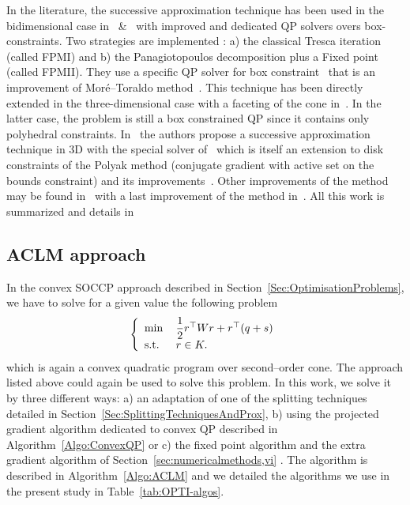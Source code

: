 In the literature, the successive approximation technique has been used in the bidimensional case in~\citep{Haslinger.ea_CMAME2002} \&~\citep{Dostal_JCAM2002} with improved and dedicated QP solvers overs box-constraints. Two strategies are implemented : a) the classical Tresca iteration (called FPMI) and  b) the Panagiotopoulos decomposition plus a Fixed point (called FPMII). They use  a specific QP solver for box constraint~\cite{Dostal_SIOPT1997} that is an improvement of Mor\'e--Toraldo method~\citep{More.Toraldo1991}. This technique has been directly extended in the three-dimensional case with a faceting of the cone in~\cite{Haslinger.ea_JCAM2004}. In the latter case, the problem is still a  box constrained QP since it contains only polyhedral constraints. In~\cite{Haslinger.ea_MCS2012} the authors propose a successive approximation technique in 3D with the special solver of~\cite{Kucera_OMS2007,Kucera_SIOPT2008} which is itself an extension to disk constraints of the Polyak method (conjugate gradient with active set on the bounds constraint) and its improvements~\cite{Dostal_SIOPT1997,Dostal.Schoberl_COA2005}. Other improvements of the method may be found in~\cite{Dostal.Kucera_SIOPT2010} with a last improvement of the method in~\cite{Dostal.Kozubek_MP2012}. All this work is summarized and details in ~\cite{Dostal.ea_AMM2016}


\subsection{ACLM approach}

In the convex SOCCP approach described in Section~\ref{Sec:OptimisationProblems}, we have to solve for a given value the following problem
\begin{equation}\label{eq:ACLM-4}
  \left\{
    \begin{array}{ll}
      \min\,&\Frac 1 2 r^\top W r + r^\top (q + s)  \\
      \text{s.t. } & r \in K.
    \end{array}
  \right.
\end{equation}
which is again a convex quadratic program over second--order cone. The approach listed above could again be used to solve this problem. In this work, we solve it by three different ways: a) an adaptation of one of the splitting techniques detailed in Section~\ref{Sec:SplittingTechniquesAndProx}, b) using the projected gradient algorithm dedicated to convex QP described in Algorithm~\ref{Algo:ConvexQP} or c) the fixed point algorithm and the extra gradient algorithm of Section~\ref{sec:numericalmethods,vi} . The algorithm is described in Algorithm~\ref{Algo:ACLM} and we detailed the algorithms we use in the present study in Table~\ref{tab:OPTI-algos}.


